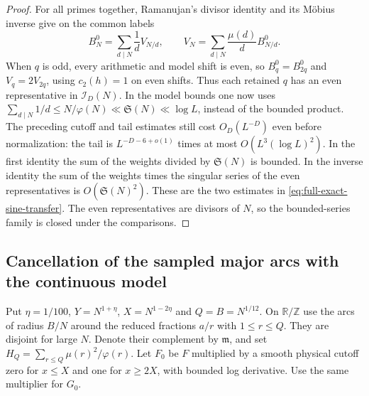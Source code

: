 \documentclass[11pt,a4paper]{article}
\numberwithin{equation}{section}
\newcommand{\SSS}{\mathfrak S}
\begin{document}
\begin{proof}
For all primes together, Ramanujan's divisor identity and its
M\"obius inverse give on the common labels
\[
 B_N^0=\sum_{d\mid N}\frac1d V_{N/d},\qquad
 V_N=\sum_{d\mid N}\frac{\mu(d)}d B_{N/d}^0 .
\]
When $q$ is odd, every arithmetic and model shift is even,
so $B_q^0=B_{2q}^0$ and $V_q=2V_{2q}$, using $c_2(h)=1$
on even shifts. Thus each retained $q$ has an even representative
in $\mathcal I_D(N)$. In the model bounds one now uses
$\sum_{d\mid N}1/d\le N/\varphi(N)\ll\SSS(N)\ll\log L$,
instead of the bounded product. The preceding cutoff and tail
estimates still cost $O_D(L^{-D})$ even before normalization:
the tail is $L^{-D-6+o(1)}$ times at most $O(L^3(\log L)^2)$.
In the first identity the sum of the weights divided by
$\SSS(N)$ is bounded. In the inverse identity the sum of the
weights times the singular series of the even representatives
is $O(\SSS(N)^2)$. These are the two estimates in
\eqref{eq:full-exact-sine-transfer}. The even representatives
are divisors of $N$, so the bounded-series family is closed
under the comparisons.
\end{proof}

\subsection{Cancellation of the sampled major arcs with the continuous model}

Put $\eta=1/100$, $Y=N^{1+\eta}$, $X=N^{1-2\eta}$ and
$Q=B=N^{1/12}$. On $\mathbb R/\mathbb Z$ use the arcs of radius
$B/N$ around the reduced fractions $a/r$ with $1\le r\le Q$.
They are disjoint for large $N$. Denote their complement by
$\mathfrak m$, and set
$H_Q=\sum_{r\le Q}\mu(r)^2/\varphi(r)$. Let $F_0$ be $F$
multiplied by a smooth physical cutoff zero for $x\le X$ and
one for $x\ge2X$, with bounded log derivative. Use the same
multiplier for $G_0$.
\end{document}
